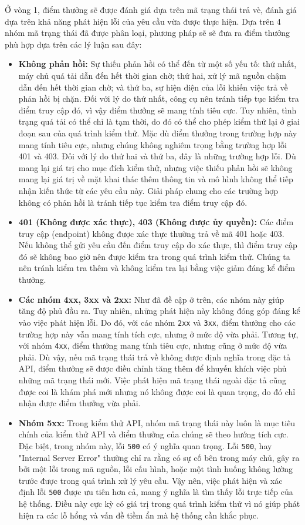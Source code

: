 Ở vòng 1, điểm thưởng sẽ được đánh giá dựa trên mã trạng thái trả vè, đánh giá dựa trên khả năng phát hiện lỗi của yêu cầu vừa được thực hiện. Dựa trên 4 nhóm mã trạng thái đã được phân loại, phương pháp sẽ sẽ đưa ra điểm thưởng phù hợp dựa trên các lý luận sau đây:
\begin{itemize}
    \item \textbf{Không phản hồi: }Sự thiếu phản hồi có thể đến từ một số yếu tố: thứ nhất, máy chủ quá tải dẫn đến hết thời gian chờ; thứ hai, xử lý mã nguồn chậm dẫn đến hết thời gian chờ; và thứ ba, sự hiện diện của lỗi khiến việc trả về phản hồi bị chặn. Đối với lý do thứ nhất, công cụ nên tránh tiếp tục kiểm tra điểm truy cập đó, vì vậy điểm thưởng sẽ mang tính tiêu cực. Tuy nhiên, tình trạng quá tải có thể chỉ là tạm thời, do đó có thể cho phép kiểm thử lại ở giai đoạn sau của quá trình kiểm thử. Mặc dù điểm thưởng trong trường hợp này mang tính tiêu cực, nhưng chúng không nghiêm trọng bằng trường hợp lỗi 401 và 403. Đối với lý do thứ hai và thứ ba, đây là những trường hợp lỗi. Dù mang lại giá trị cho mục đích kiểm thử, nhưng việc thiếu phản hồi sẽ không mang lại giá trị về mặt khai thác thêm thông tin và mô hình không thể tiếp nhận kiến thức từ các yêu cầu này. Giải pháp chung cho các trường hợp không có phản hồi là tránh tiếp tục kiểm tra điểm truy cập đó.
    \item \textbf{401 (Không được xác thực), 403 (Không được ủy quyền):} Các điểm truy cập (endpoint) không được xác thực thường trả về mã 401 hoặc 403. Nếu không thể gửi yêu cầu đến điểm truy cập do xác thực, thì điểm truy cập đó sẽ không bao giờ nên được kiểm tra trong quá trình kiểm thử. Chúng ta nên tránh kiểm tra thêm và không kiểm tra lại bằng việc giảm đáng kể điểm thưởng.
    \item  \textbf{Các nhóm 4xx, 3xx và 2xx:} Như đã đề cập ở trên, các nhóm này giúp tăng độ phủ đầu ra. Tuy nhiên, những phát hiện này không đóng góp đáng kể vào việc phát hiện lỗi. Do đó, với các nhóm \texttt{2xx} và \texttt{3xx}, điểm thưởng cho các trường hợp này vẫn mang tính tích cực, nhưng ở mức độ vừa phải. Tương tự, với nhóm \texttt{4xx}, điểm thưởng mang tính tiêu cực, nhưng cũng ở mức độ vừa phải. Dù vậy, nếu mã trạng thái trả về không được định nghĩa trong đặc tả API, điểm thưởng sẽ được điều chỉnh tăng thêm để khuyến khích việc phủ những mã trạng thái mới. Việc phát hiện mã trạng thái ngoài đặc tả cũng được coi là khám phá mới nhưng nó không được coi là quan trọng, do đó chỉ nhận được điểm thưởng vừa phải.
    \item \textbf{Nhóm 5xx:} Trong kiểm thử API, nhóm mã trạng thái này luôn là mục tiêu chính của kiểm thử API và điểm thưởng của chúng sẽ theo hướng tích cực. Đặc biệt, trong nhóm này, lỗi \texttt{500} có ý nghĩa quan trọng. Lỗi \texttt{500}, hay "Internal Server Error" thường chỉ ra rằng có sự cố bên trong máy chủ, gây ra bởi một lỗi trong mã nguồn, lỗi cấu hình, hoặc một tình huống không lường trước được trong quá trình xử lý yêu cầu. Vậy nên, việc phát hiện và xác định lỗi \texttt{500}
 được ưu tiên hơn cả, mang ý nghĩa là tìm thấy lỗi trực tiếp của hệ thống. Điều này cực kỳ có giá trị trong quá trình kiểm thử vì nó giúp phát hiện ra các lỗ hổng và vấn đề tiềm ẩn mà hệ thống cần khắc phục.
\end{itemize}
